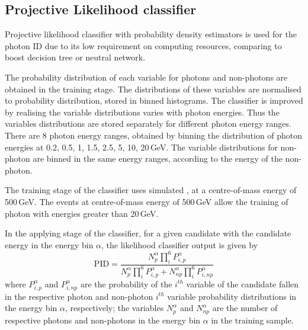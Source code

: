 
\subsection{Projective Likelihood classifier}


Projective likelihood classifier  with probability density estimators is used  for the photon ID due to its  low requirement on computing resources, comparing to boost decision tree or neutral network.

The probability distribution of each variable for photons and non-photons are obtained in the training stage. The distributions of these variables are normalised to probability distribution, stored in binned histograms. The classifier is improved by realising the variable distributions varies with photon energies. Thus the variables distributions are stored separately for different photon energy ranges. There are 8 photon energy ranges, obtained by binning the distribution of photon energies at 0.2, 0.5, 1, 1.5, 2.5, 5, 10, 20\,GeV. The variable distributions for non-photon are binned in the same energy ranges, according to the energy of the non-photon. 

The training stage of the classifier uses simulated  \eeZuds, at a centre-of-mass energy of 500\,GeV. The events at centre-of-mass energy of 500\,GeV allow the training of photon with energies greater than 20\,GeV.


In the applying stage of the classifier, for a given candidate with the candidate energy in the  energy bin $\alpha$, the likelihood classifier output is given by
\begin{equation}
\text{PID} = \frac{N_p^\alpha \prod_{i}^6{P_{i,p}^\alpha}}{N_p^\alpha\prod_{i}^6{P_{i,p}^\alpha} + N_{np}^\alpha\prod_{i}^6{P_{i,np}^\alpha}}
\end{equation}
where $P^\alpha_{i,p}$ and $P^\alpha_{i,np}$ are the probability of the   $i^{th}$ variable  of the candidate fallen in the  respective photon and non-photon $i^{th}$ variable probability distributions  in the energy bin $\alpha$, respectively; the variables $N^\alpha_{p}$ and $N^\alpha_{np}$ are the number of respective photons and non-photons in the energy bin $\alpha$ in the training sample.


